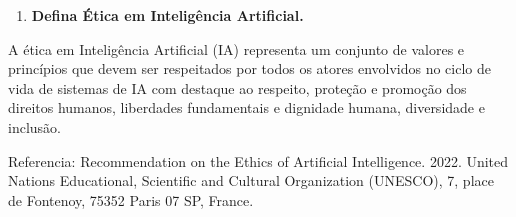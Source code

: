 \begin{enumerate}\bfseries
    \item \textbf{Defina Ética em Inteligência Artificial. }
\end{enumerate}

A ética em Inteligência Artificial (IA) representa um conjunto de valores e princípios que devem ser respeitados por todos os atores envolvidos no ciclo de vida de sistemas de IA com destaque ao respeito, proteção e promoção dos direitos humanos, liberdades fundamentais e dignidade humana, diversidade e inclusão.

Referencia: Recommendation on the Ethics of Artificial Intelligence. 2022. United Nations Educational, Scientific and Cultural Organization (UNESCO), 7, place de Fontenoy, 75352 Paris 07 SP, France.

\cite{chen_fu_lyu}